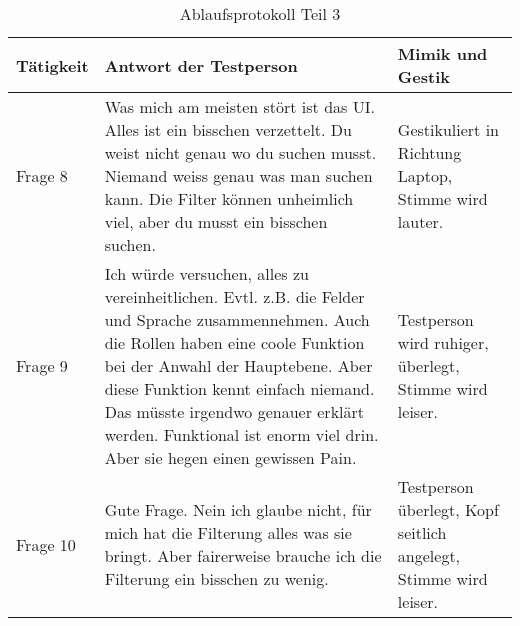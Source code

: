 \begin{table}[h!]
   \begin{tabular}{|L{0.3\textwidth}|L{0.4\textwidth}|L{0.2\textwidth}|}
       \hline
       \color{white}Tätigkeit & \color{white} Antwort der Testperson & \color{white} Mimik und Gestik \\
       \hline
       Frage 8 & Was mich am meisten stört ist das UI. Alles ist ein bisschen verzettelt. Du weist nicht genau wo du suchen musst. Niemand weiss genau
       was man suchen kann. Die Filter können unheimlich viel, aber du musst ein bisschen suchen. & Gestikuliert in Richtung Laptop, Stimme wird lauter. \\
       \hline
       Frage 9 & Ich würde versuchen, alles zu vereinheitlichen. Evtl. z.B. die Felder und Sprache zusammennehmen. Auch die Rollen
       haben eine coole Funktion bei der Anwahl der Hauptebene. Aber diese Funktion kennt einfach niemand. Das müsste irgendwo genauer erklärt werden.
       Funktional ist enorm viel drin. Aber sie hegen einen gewissen Pain. & Testperson wird ruhiger, überlegt, Stimme wird leiser. \\
       \hline
       Frage 10 & Gute Frage. Nein ich glaube nicht, für mich hat die Filterung alles was sie bringt. Aber fairerweise brauche ich die Filterung
       ein bisschen zu wenig. & Testperson überlegt, Kopf seitlich angelegt, Stimme wird leiser. \\
     \hline
     \end{tabular}
     \caption{Ablaufsprotokoll Teil 3}
\end{table}

\newpage

